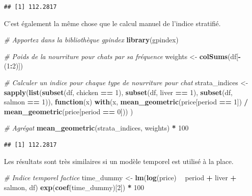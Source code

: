 \documentclass[]{article}
\newenvironment{Shaded}{\begin{snugshade}}{\end{snugshade}}
\newcommand{\CommentTok}[1]{\textcolor[rgb]{0.56,0.35,0.01}{\textit{#1}}}
\newcommand{\ControlFlowTok}[1]{\textcolor[rgb]{0.13,0.29,0.53}{\textbf{#1}}}
\newcommand{\DecValTok}[1]{\textcolor[rgb]{0.00,0.00,0.81}{#1}}
\newcommand{\KeywordTok}[1]{\textcolor[rgb]{0.13,0.29,0.53}{\textbf{#1}}}
\newcommand{\NormalTok}[1]{#1}
\newcommand{\OperatorTok}[1]{\textcolor[rgb]{0.81,0.36,0.00}{\textbf{#1}}}
\newcommand{\StringTok}[1]{\textcolor[rgb]{0.31,0.60,0.02}{#1}}
\begin{document}
\begin{verbatim}
## [1] 112.2817
\end{verbatim}

C'est également la même chose que le calcul manuel de l'indice stratifié.

\begin{Shaded}
\begin{Highlighting}[]
\CommentTok{# Apportez dans la bibliothèque gpindex}
\KeywordTok{library}\NormalTok{(gpindex)}

\CommentTok{# Poids de la nourriture pour chats par sa fréquence}
\NormalTok{weights <-}\StringTok{ }\KeywordTok{colSums}\NormalTok{(df[}\OperatorTok{-}\NormalTok{(}\DecValTok{1}\OperatorTok{:}\DecValTok{2}\NormalTok{)])}

\CommentTok{# Calculer un indice pour chaque type de nourriture pour chat}
\NormalTok{strata_indices <-}\StringTok{ }
\StringTok{  }\KeywordTok{sapply}\NormalTok{(}\KeywordTok{list}\NormalTok{(}\KeywordTok{subset}\NormalTok{(df, chicken }\OperatorTok{==}\StringTok{ }\DecValTok{1}\NormalTok{), }
              \KeywordTok{subset}\NormalTok{(df, liver }\OperatorTok{==}\StringTok{ }\DecValTok{1}\NormalTok{), }
              \KeywordTok{subset}\NormalTok{(df, salmon }\OperatorTok{==}\StringTok{ }\DecValTok{1}\NormalTok{)),}
         \ControlFlowTok{function}\NormalTok{(x) }\KeywordTok{with}\NormalTok{(x, }\KeywordTok{mean_geometric}\NormalTok{(price[period }\OperatorTok{==}\StringTok{ }\DecValTok{1}\NormalTok{]) }\OperatorTok{/}\StringTok{ }\KeywordTok{mean_geometric}\NormalTok{(price[period }\OperatorTok{==}\StringTok{ }\DecValTok{0}\NormalTok{]))}
\NormalTok{         )}

\CommentTok{# Agrégat}
\KeywordTok{mean_geometric}\NormalTok{(strata_indices, weights) }\OperatorTok{*}\StringTok{ }\DecValTok{100}
\end{Highlighting}
\end{Shaded}

\begin{verbatim}
## [1] 112.2817
\end{verbatim}

Les résultats sont très similaires si un modèle temporel est utilisé à la place.

\begin{Shaded}
\begin{Highlighting}[]
\CommentTok{# Indice temporel factice}
\NormalTok{time_dummy <-}\StringTok{ }\KeywordTok{lm}\NormalTok{(}\KeywordTok{log}\NormalTok{(price) }\OperatorTok{~}\StringTok{ }\NormalTok{period }\OperatorTok{+}\StringTok{ }\NormalTok{liver }\OperatorTok{+}\StringTok{ }\NormalTok{salmon, df)}
\KeywordTok{exp}\NormalTok{(}\KeywordTok{coef}\NormalTok{(time_dummy)[}\DecValTok{2}\NormalTok{]) }\OperatorTok{*}\StringTok{ }\DecValTok{100}
\end{Highlighting}
\end{Shaded}
\end{document}
